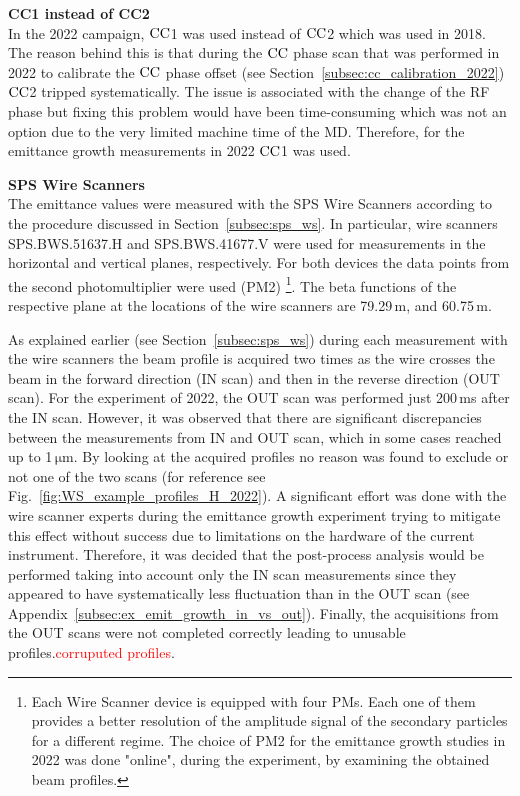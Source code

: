 \textbf{CC1 instead of CC2}\\
In the 2022 campaign, ${\mathrm{CC}}$1 was used instead of ${\mathrm{CC}}$2 which was used in 2018. The reason behind this is that during the ${\mathrm{CC}}$ phase scan that was performed in 2022 to calibrate the ${\mathrm{CC}}$ phase offset (see Section~\ref{subsec:cc_calibration_2022}) ${\mathrm{CC}}$2 tripped systematically. The issue is associated with the change of the RF phase but fixing this problem would have been time-consuming which was not an option due to the very limited machine time of the MD. Therefore, for the emittance growth measurements in 2022 ${\mathrm{CC}}$1 was used.

\textbf{SPS Wire Scanners}\\
The emittance values were measured with the SPS Wire Scanners according to the procedure discussed in Section~\ref{subsec:sps_ws}. In particular, wire scanners SPS.BWS.51637.H and SPS.BWS.41677.V were used for measurements in the horizontal and vertical planes, respectively. For both devices the data points from the second photomultiplier were used (PM2) \footnote{Each Wire Scanner device is equipped with four PMs. Each one of them provides a better resolution of the amplitude signal of the secondary particles for a different regime. The choice of PM2 for the emittance growth studies in 2022 was done "online", during the experiment, by examining the obtained beam profiles.}. The beta functions of the respective plane at the locations of the wire scanners are 79.29\,m, and  60.75\,m. 

As explained earlier (see Section~\ref{subsec:sps_ws}) during each measurement with the wire scanners the beam profile is acquired two times as the wire crosses the beam in the forward direction (IN scan) and then in the reverse direction (OUT scan). For the experiment of 2022, the OUT scan was performed just 200\,ms after the IN scan. However, it was observed that there are significant discrepancies between the measurements from IN and OUT scan, which in some cases reached up to 1\,$\mathrm{\mu m}$. By looking at the acquired profiles no reason was found to exclude or not one of the two scans (for reference see Fig.~\ref{fig:WS_example_profiles_H_2022}). A significant effort was done with the wire scanner experts during the emittance growth experiment trying to mitigate this effect without success due to limitations on the hardware of the current instrument. Therefore, it was decided that the post-process analysis would be performed taking into account only the IN scan measurements since they appeared to have systematically less fluctuation than in the OUT scan (see Appendix~\ref{subsec:ex_emit_growth_in_vs_out}). Finally, the acquisitions from the OUT scans were not completed correctly leading to unusable profiles.\textcolor{red}{corruputed profiles}. 

